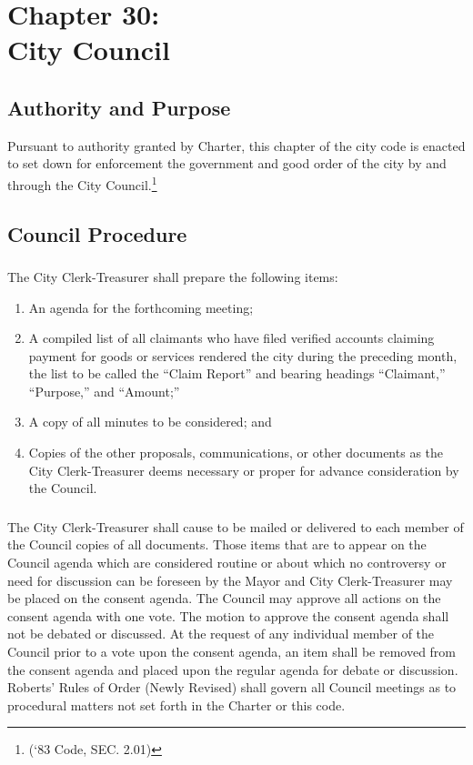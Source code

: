 \chapter*{Chapter 30: \\
	City Council}
    \vfill
    \minitoc
    \pagebreak

\section{Authority and Purpose}
Pursuant to authority granted by Charter, this chapter of the city code is enacted to set down for enforcement the government and good order of the city by and through the City Council.\footnote{(‘83 Code, SEC. 2.01)}


\section{Council Procedure}
\subsection{}
The City Clerk-Treasurer shall prepare the following items:
\begin{enumerate}
    \item An agenda for the forthcoming meeting;
    \item A compiled list of all claimants who have filed verified accounts claiming payment for goods or services rendered the city during the preceding month, the list to be called the “Claim Report” and bearing headings “Claimant,” “Purpose,” and “Amount;”
    \item A copy of all minutes to be considered; and
    \item Copies of the other proposals, communications, or other documents as the City Clerk-Treasurer deems necessary or proper for advance consideration by the Council.
\end{enumerate}
\subsection{}
The City Clerk-Treasurer shall cause to be mailed or delivered to each member of the Council copies of all documents.  Those items that are to appear on the Council agenda which are considered routine or about which no controversy or need for discussion can be foreseen by the Mayor and City Clerk-Treasurer may be placed on the consent agenda.  The Council may approve all actions on the consent agenda with one vote.  The motion to approve the consent agenda shall not be debated or discussed.  At the request of any individual member of the Council prior to a vote upon the consent agenda, an item shall be removed from the consent agenda and placed upon the regular agenda for debate or discussion.  Roberts’ Rules of Order (Newly Revised) shall govern all Council meetings as to procedural matters not set forth in the Charter or this code.
